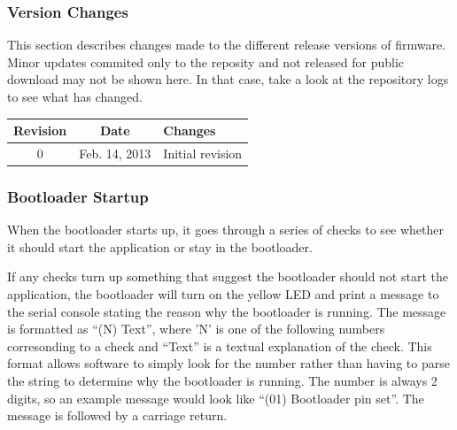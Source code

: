 \documentclass{article}
\begin{document}
\subsubsection{Version Changes} \label{sssec:FWBootChanges}
This section describes changes made to the different release versions of firmware.  Minor updates
commited only to the reposity and not released for public download may not be shown here.  In that
case, take a look at the repository logs to see what has changed.

\begin{center}
    \begin{tabular}{c|c|p{}}
        Revision & Date & Changes \\
        \hline
        0 & Feb. 14, 2013 & Initial revision \\
    \end{tabular}
\end{center}

\subsubsection{Bootloader Startup} \label{sssec:FWBootStartup}
When the bootloader starts up, it goes through a series of checks to see whether it should start the
application or stay in the bootloader.

If any checks turn up something that suggest the bootloader should not start the application, the
bootloader will turn on the yellow LED and print a message to the serial console stating the reason
why the bootloader is running.  The message is formatted as ``(N) Text'', where 'N' is one of the
following numbers corresonding to a check and ``Text'' is a textual explanation of the check.  This
format allows software to simply look for the number rather than having to parse the string to
determine why the bootloader is running.  The number is always 2 digits, so an example message would
look like ``(01) Bootloader pin set''.  The message is followed by a carriage return.
\end{document}
